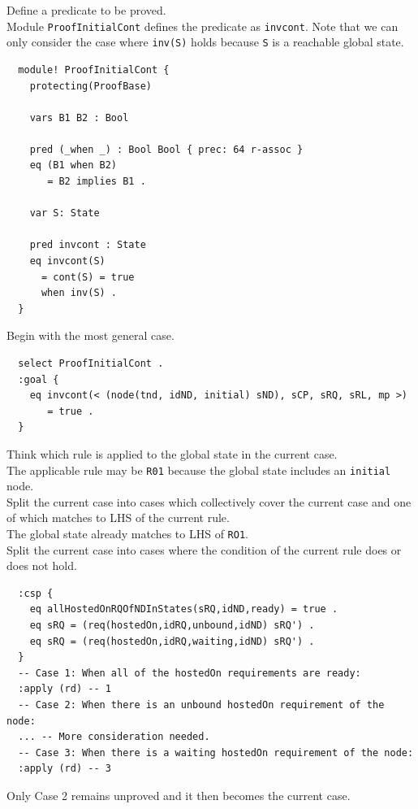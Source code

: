 \documentclass[12pt]{report}
\newcommand{\stt}[1]{{\small{\tt {#1}}}}
\begin{document}
 Define a predicate to be proved.\\
Module {\tt ProofInitialCont} defines the predicate as {\tt invcont}.
Note that we can only consider the case where \stt{inv(S)} holds
because {\tt S} is a reachable global state.
\small
\begin{verbatim}
  module! ProofInitialCont {
    protecting(ProofBase)
  
    vars B1 B2 : Bool
  
    pred (_when _) : Bool Bool { prec: 64 r-assoc }
    eq (B1 when B2)
       = B2 implies B1 .
  
    var S: State
  
    pred invcont : State
    eq invcont(S) 
      = cont(S) = true
      when inv(S) .
  }
\end{verbatim}
\normalsize
 Begin with the most general case.
\small
\begin{verbatim}
  select ProofInitialCont .
  :goal {
    eq invcont(< (node(tnd, idND, initial) sND), sCP, sRQ, sRL, mp >) 
       = true .
  }
\end{verbatim}
\normalsize
 Think which rule is applied to the 
global state in the current case. \\
The applicable rule may be {\tt R01} because the global state includes
an {\tt initial} node.\\

 Split the current case into cases which
collectively cover the current case and one of which matches to LHS of
the current rule. \\ 
The global state already matches to LHS of {\tt RO1}.\\

 Split the current case into cases where
the condition of the current rule does or does not hold.
\small
\begin{verbatim}
  :csp { 
    eq allHostedOnRQOfNDInStates(sRQ,idND,ready) = true .
    eq sRQ = (req(hostedOn,idRQ,unbound,idND) sRQ') .
    eq sRQ = (req(hostedOn,idRQ,waiting,idND) sRQ') .
  }
  -- Case 1: When all of the hostedOn requirements are ready:
  :apply (rd) -- 1
  -- Case 2: When there is an unbound hostedOn requirement of the node:
  ... -- More consideration needed.
  -- Case 3: When there is a waiting hostedOn requirement of the node:
  :apply (rd) -- 3
\end{verbatim}
\normalsize
Only Case 2 remains unproved and it then becomes the current case.\\
\end{document}
